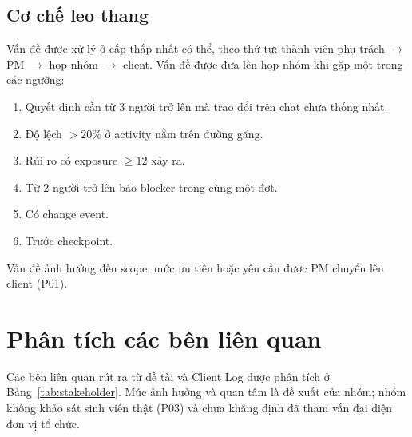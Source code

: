 \subsection*{Cơ chế leo thang}
Vấn đề được xử lý ở cấp thấp nhất có thể, theo thứ tự: thành viên phụ trách $\rightarrow$ PM $\rightarrow$ họp nhóm $\rightarrow$ client. Vấn đề được đưa lên họp nhóm khi gặp một trong các ngưỡng:
\begin{enumerate}
  \item Quyết định cần từ 3 người trở lên mà trao đổi trên chat chưa thống nhất.
  \item Độ lệch $>20\%$ ở activity nằm trên đường găng.
  \item Rủi ro có exposure $\geq 12$ xảy ra.
  \item Từ 2 người trở lên báo blocker trong cùng một đợt.
  \item Có change event.
  \item Trước checkpoint.
\end{enumerate}
Vấn đề ảnh hưởng đến scope, mức ưu tiên hoặc yêu cầu được PM chuyển lên client (P01).

\section{Phân tích các bên liên quan}
\label{sec:1-6}
Các bên liên quan rút ra từ đề tài và Client Log được phân tích ở Bảng~\ref{tab:stakeholder}. Mức ảnh hưởng và quan tâm là đề xuất của nhóm; nhóm không khảo sát sinh viên thật (P03) và chưa khẳng định đã tham vấn đại diện đơn vị tổ chức.

